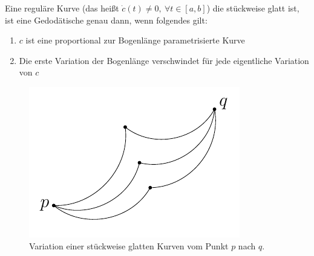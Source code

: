 \begin{satz}
    Eine reguläre Kurve (das heißt $\dot{c}(t)\neq 0, \ \forall t \in [a, b]$) die stückweise glatt ist, ist eine Gedodätische genau dann, wenn folgendes gilt:
    \begin{enumerate}
    \item $c$ ist eine proportional zur Bogenlänge parametrisierte Kurve
    \item Die erste Variation der Bogenlänge verschwindet für jede eigentliche Variation von $c$
    \end{enumerate}
    
\begin{figure}[H]
\centering
\includegraphics[width=0.45\linewidth]{figures/tikz/variationpiecewise.pdf}
\caption{Variation einer stückweise glatten Kurven vom Punkt $p$ nach $q$.}
\label{img:variationpiecewise}
\end{figure} 
\end{satz}
